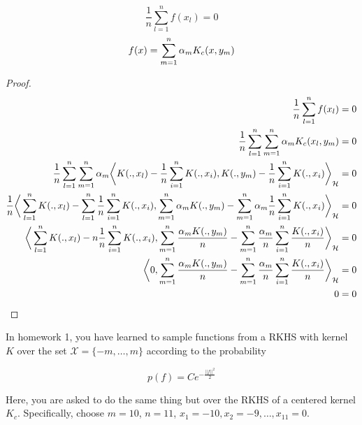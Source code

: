 \documentclass{article}
\begin{document}
\begin{enumerate}
        \begin{equation}
            \frac{1}{n} \sum_{l=1}^n f(x_l)=0
        \end{equation}
        \[f(x) = \sum_{m=1}^n \alpha_m K_c(x,y_m) \notag \]
        \begin{proof}
        \begin{equation} 
            \begin{aligned} 
                \frac{1}{n} \sum_{l=1}^n f(x_l) &=0 \notag \\
                \frac{1}{n} \sum_{l=1}^n \sum_{m=1}^n \alpha_m K_c(x_l,y_m) &=0 \\
                \frac{1}{n} \sum_{l=1}^n \sum_{m=1}^n \alpha_m \bigg \langle K(.,x_l)- \frac{1}{n}\sum_{i=1}^n K(.,x_i), 
                    K(.,y_m)-\frac{1}{n}\sum_{i=1}^n K(.,x_i) \bigg \rangle_{\mathcal{H}}  &=0 \\
                \frac{1}{n} \bigg \langle \sum_{l=1}^n K(.,x_l)- \sum_{l=1}^n \frac{1}{n}\sum_{i=1}^n K(.,x_i), 
                    \sum_{m=1}^n \alpha_m K(.,y_m)-\sum_{m=1}^n \alpha_m \frac{1}{n}\sum_{i=1}^n K(.,x_i) \bigg \rangle_{\mathcal{H}}  &=0 \\
                \bigg \langle \sum_{l=1}^n K(.,x_l)- n \frac{1}{n}\sum_{i=1}^n K(.,x_i), 
                    \sum_{m=1}^n \frac{\alpha_m K(.,y_m)}{n}-\sum_{m=1}^n \frac{\alpha_m}{n}\sum_{i=1}^n \frac{K(.,x_i)}{n}  \bigg \rangle_{\mathcal{H}}  &=0 \\
                \bigg \langle 0, 
                    \sum_{m=1}^n \frac{\alpha_m K(.,y_m)}{n}-\sum_{m=1}^n \frac{\alpha_m}{n}\sum_{i=1}^n \frac{K(.,x_i)}{n}  \bigg \rangle_{\mathcal{H}}  &=0 \\
                    0&=0 \\
            \end{aligned} 
        \end{equation}
        \end{proof} 
        
        In homework 1, you have learned to sample functions from a RKHS with kernel $K$ over the set $\mathcal{X}=\{-m,\ldots,m\}$ according to the probability 
        
        \begin{equation}
            p(f)=Ce^{-\frac{||f||^2}{2}}
        \end{equation} 

        Here, you are asked to do the same thing but over the RKHS of a centered kernel $K_c$. 
        Specifically, choose  $m=10$, $n=11$, $x_1=-10,x_2=-9,\ldots,x_{11}=0$.


\end{enumerate}
\end{document}
